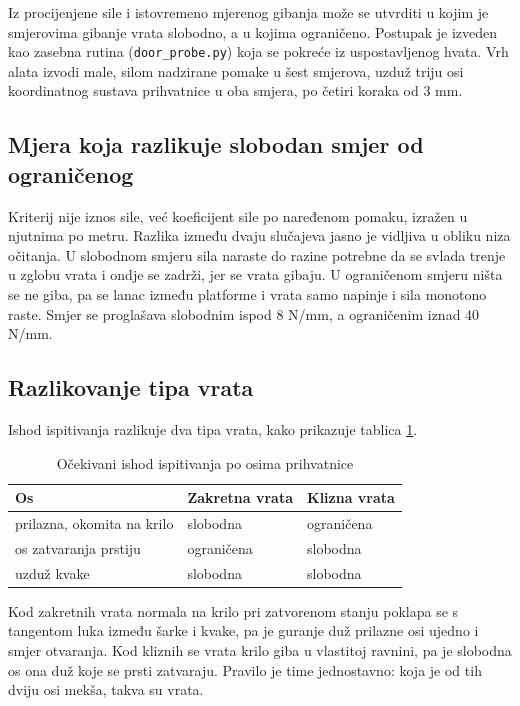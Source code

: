 Iz procijenjene sile i istovremeno mjerenog gibanja može se utvrditi u kojim je smjerovima gibanje
vrata slobodno, a u kojima ograničeno. Postupak je izveden kao zasebna rutina
(\texttt{door\_probe.py}) koja se pokreće iz uspostavljenog hvata. Vrh alata izvodi male,
silom nadzirane pomake u šest smjerova, uzduž triju osi koordinatnog sustava prihvatnice u oba
smjera, po četiri koraka od 3 mm.

\subsection{Mjera koja razlikuje slobodan smjer od ograničenog}

Kriterij nije iznos sile, već koeficijent sile po naređenom pomaku, izražen u njutnima po metru.
Razlika između dvaju slučajeva jasno je vidljiva u obliku niza očitanja. U slobodnom smjeru sila
naraste do razine potrebne da se svlada trenje u zglobu vrata i ondje se zadrži, jer se vrata
gibaju. U ograničenom smjeru ništa se ne giba, pa se lanac između platforme i vrata samo napinje
i sila monotono raste. Smjer se proglašava slobodnim ispod 8 N/mm, a ograničenim iznad 40 N/mm.

\subsection{Razlikovanje tipa vrata}
\label{sec:tip-iz-sile}

Ishod ispitivanja razlikuje dva tipa vrata, kako prikazuje tablica \ref{tab:probe-osi}.

\begin{table}[H]
    \centering
    \caption{Očekivani ishod ispitivanja po osima prihvatnice}
    \label{tab:probe-osi}
    \begin{tabular}{@{}lll@{}}
        \toprule
        Os                         & Zakretna vrata & Klizna vrata \\
        \midrule
        prilazna, okomita na krilo & slobodna       & ograničena   \\
        os zatvaranja prstiju      & ograničena     & slobodna     \\
        uzduž kvake                & slobodna       & slobodna     \\
        \bottomrule
    \end{tabular}
\end{table}

Kod zakretnih vrata normala na krilo pri zatvorenom stanju poklapa se s tangentom luka između
šarke i kvake, pa je guranje duž prilazne osi ujedno i smjer otvaranja. Kod kliznih se vrata krilo
giba u vlastitoj ravnini, pa je slobodna os ona duž koje se prsti zatvaraju. Pravilo je time
jednostavno: koja je od tih dviju osi mekša, takva su vrata.

